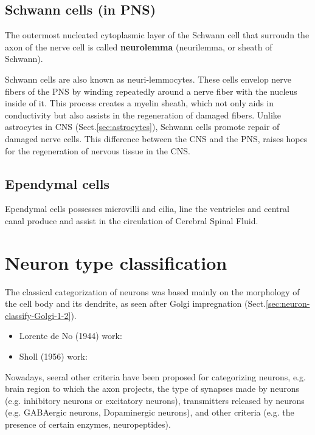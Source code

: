 \subsection{Schwann cells (in PNS)}
\label{sec:Schwann_cells}

The outermost nucleated cytoplasmic layer of the Schwann cell that surroudn
the axon of the nerve cell is called {\bf neurolemma} (neurilemma, or
sheath of Schwann).

Schwann cells are also known as neuri-lemmocytes. These cells envelop nerve
fibers of the PNS by winding repeatedly around a nerve fiber with the nucleus
inside of it. This process creates a myelin sheath, which not only aids in
conductivity but also assists in the regeneration of damaged fibers.
Unlike astrocytes in CNS (Sect.\ref{sec:astrocytes}), Schwann cells promote
repair of damaged nerve cells.
This difference between the CNS and the PNS, raises hopes for the regeneration
of nervous tissue in the CNS.

\subsection{Ependymal cells}
\label{sec:ependymal-cell}
  
Ependymal cells  possesses microvilli and cilia, line the ventricles and central
canal produce and assist in the circulation of Cerebral Spinal Fluid.

\section{Neuron type classification}
\label{sec:neuron-type-classification}

The classical categorization of neurons was based mainly on the morphology of
the cell body and its dendrite, as seen after Golgi impregnation
(Sect.\ref{sec:neuron-classify-Golgi-1-2}).
\begin{itemize}
  \item Lorente de No (1944) work:
  \item Sholl (1956) work:
\end{itemize}

Nowadays, seeral other criteria have been proposed for categorizing neurons,
e.g. brain region to which the axon projects, the type of synapses made by
neurons (e.g. inhibitory neurons or excitatory neurons), transmitters released
by neurons (e.g. GABAergic neurons, Dopaminergic neurons), and other criteria
(e.g. the presence of certain enzymes, neuropeptides).

